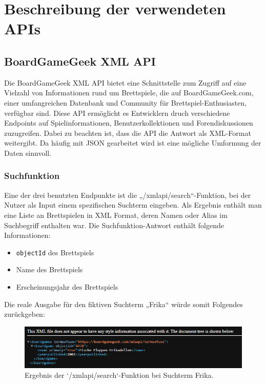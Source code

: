 \section{Beschreibung der verwendeten APIs}
\subsection{BoardGameGeek XML API }
Die BoardGameGeek XML API bietet eine Schnittstelle zum Zugriff auf eine Vielzahl von Informationen rund um Brettspiele,
die auf BoardGameGeek.com, einer umfangreichen Datenbank und Community für Brettspiel-Enthusiasten,
verfügbar sind. Diese API ermöglicht es Entwicklern druch verschiedene Endpoints auf Spielinformationen,
Benutzerkollektionen und Forendiskussionen zuzugreifen. Dabei zu beachten ist, dass die API die Antwort als XML-Format weitergibt. 
Da häufig mit JSON gearbeitet wird ist eine mögliche Umformung der Daten sinnvoll.
\subsubsection{Suchfunktion}
Eine der drei benutzten Endpunkte ist die „/xmlapi/search“-Funktion, bei der Nutzer als Input einem spezifischen Suchterm eingeben.
Als Ergebnis enthält man eine Liste an Brettspielen in XML Format, deren Namen oder Alias im Suchbegriff enthalten war.
Die Suchfunktion-Antwort enthält folgende Informationen:
\begin{itemize}
    \item {\texttt{objectId} des Brettspiels}
    \item {Name des Brettspiels}
    \item {Erscheinungsjahr des Brettspiels}
\end{itemize}
Die reale Ausgabe für den fiktiven Suchterm „Frika“ würde somit Folgendes zurückgeben: 
\begin{figure}[h]
    \centering
    \includegraphics[width=1\textwidth]{graphics/Search_API.png}
    \caption{Ergebnis der `/xmlapi/search`-Funktion bei Suchterm Frika.}
    \label{fig:Search_API}
\end{figure}
